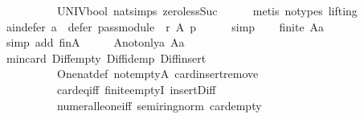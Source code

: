 \begin{isabellebody}
\ \ \ \ \ \ \ \ \ \ UNIV{\isacharunderscore}{\kern0pt}bool\ nat{\isachardot}{\kern0pt}simps{\isacharparenleft}{\kern0pt}{}{\isacharparenright}{\kern0pt}\ zero{\isacharunderscore}{\kern0pt}less{\isacharunderscore}{\kern0pt}Suc\isanewline
\ \ \ \ \isamarkupfalse%
\ {\isacharparenleft}{\kern0pt}metis\ {\isacharparenleft}{\kern0pt}no{\isacharunderscore}{\kern0pt}types{\isacharcomma}{\kern0pt}\ lifting{\isacharparenright}{\kern0pt}{\isacharparenright}{\kern0pt}\isanewline
\ \ \isamarkupfalse%
\ a{\isacharunderscore}{\kern0pt}in{\isacharunderscore}{\kern0pt}defer{\isacharcolon}{\kern0pt}\ {\isachardoublequoteopen}a\ {\isasymin}\ defer\ {\isacharparenleft}{\kern0pt}pass{\isacharunderscore}{\kern0pt}module\ {}\ r{\isacharparenright}{\kern0pt}\ A\ p{\isachardoublequoteclose}\isanewline
\ \ \ \ \isamarkupfalse%
\ simp\isanewline
\ \ \isamarkupfalse%
\ {\isachardoublequoteopen}finite\ {\isacharparenleft}{\kern0pt}A{\isacharminus}{\kern0pt}{\isacharbraceleft}{\kern0pt}a{\isacharbraceright}{\kern0pt}{\isacharparenright}{\kern0pt}{\isachardoublequoteclose}\isanewline
\ \ \ \ \isamarkupfalse%
\ {\isacharparenleft}{\kern0pt}simp\ add{\isacharcolon}{\kern0pt}\ finA{\isacharparenright}{\kern0pt}\isanewline
\ \ \isamarkupfalse%
\ \isamarkupfalse%
\ A{\isacharunderscore}{\kern0pt}not{\isacharunderscore}{\kern0pt}only{\isacharunderscore}{\kern0pt}a{\isacharcolon}{\kern0pt}\ {\isachardoublequoteopen}A{\isacharminus}{\kern0pt}{\isacharbraceleft}{\kern0pt}a{\isacharbraceright}{\kern0pt}\ {\isasymnoteq}\ {\isacharbraceleft}{\kern0pt}{\isacharbraceright}{\kern0pt}{\isachardoublequoteclose}\isanewline
\ \ \ \ \isamarkupfalse%
\ min{\isacharunderscore}{\kern0pt}{}{\isacharunderscore}{\kern0pt}card\ Diff{\isacharunderscore}{\kern0pt}empty\ Diff{\isacharunderscore}{\kern0pt}idemp\ Diff{\isacharunderscore}{\kern0pt}insert{}\isanewline
\ \ \ \ \ \ \ \ \ \ One{\isacharunderscore}{\kern0pt}nat{\isacharunderscore}{\kern0pt}def\ not{\isacharunderscore}{\kern0pt}empty{\isacharunderscore}{\kern0pt}A\ card{\isachardot}{\kern0pt}insert{\isacharunderscore}{\kern0pt}remove\isanewline
\ \ \ \ \ \ \ \ \ \ card{\isacharunderscore}{\kern0pt}eq{\isacharunderscore}{\kern0pt}{}{\isacharunderscore}{\kern0pt}iff\ finite{\isachardot}{\kern0pt}emptyI\ insert{\isacharunderscore}{\kern0pt}Diff\isanewline
\ \ \ \ \ \ \ \ \ \ numeral{\isacharunderscore}{\kern0pt}le{\isacharunderscore}{\kern0pt}one{\isacharunderscore}{\kern0pt}iff\ semiring{\isacharunderscore}{\kern0pt}norm{\isacharparenleft}{\kern0pt}{}{}{\isacharparenright}{\kern0pt}\ card{\isachardot}{\kern0pt}empty\isanewline

\end{isabellebody}

